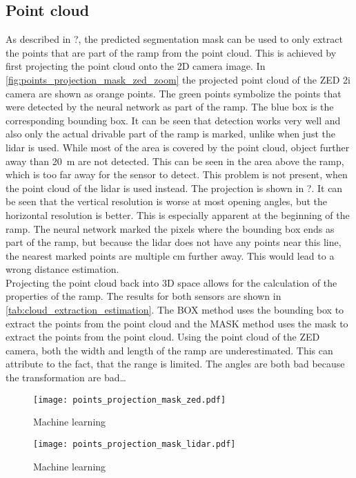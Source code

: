 \subsection{Point cloud}
As described in ?, the predicted segmentation mask can be used to only extract the points that are part of the ramp from the point cloud.
This is achieved by first projecting the point cloud onto the 2D camera image.
In \cref{fig:points_projection_mask_zed_zoom} the projected point cloud of the ZED 2i camera are shown as orange points.
The green points symbolize the points that were detected by the neural network as part of the ramp.
The blue box is the corresponding bounding box.
It can be seen that detection works very well and also only the actual drivable part of the ramp is marked, unlike when just the \gls{lidar} is used.
While most of the area is covered by the point cloud, object further away than \SI{20}{\metre} are not detected.
This can be seen in the area above the ramp, which is too far away for the sensor to detect.
This problem is not present, when the point cloud of the \gls{lidar} is used instead.
The projection is shown in ?.
It can be seen that the vertical resolution is worse at most opening angles, but the horizontal resolution is better.
This is especially apparent at the beginning of the ramp.
The neural network marked the pixels where the bounding box ends as part of the ramp, but because the \gls{lidar} does not have any points near this line, the nearest marked points are multiple \si{\cm} further away.
This would lead to a wrong distance estimation.\\
Projecting the point cloud back into 3D space allows for the calculation of the properties of the ramp.
The results for both sensors are shown in \cref{tab:cloud_extraction_estimation}.
The BOX method uses the bounding box to extract the points from the point cloud and the MASK method uses the mask to extract the points from the point cloud.
Using the point cloud of the ZED camera, both the width and length of the ramp are underestimated.
This can attribute to the fact, that the range is limited.
The angles are both bad because the transformation are bad\dots
{}
\begin{figure}[htb]
	\centering
	\texttt{[image: points\_projection\_mask\_zed.pdf]}
	\caption{Machine learning}
	\label{fig:points_projection_mask_zed}
\end{figure}
\begin{figure}[htb]
	\centering
	\texttt{[image: points\_projection\_mask\_lidar.pdf]}
	\caption{Machine learning}
	\label{fig:points_projection_mask_lidar}
\end{figure}

